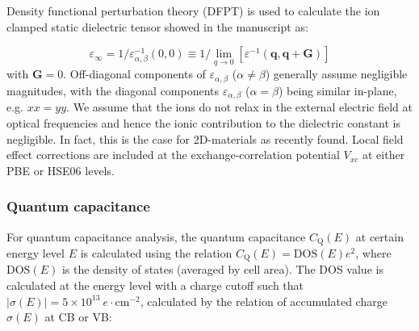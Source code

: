 \documentclass[journal=ancac3,manuscript=article,email=true,hyperref=true,keywords=true]{achemso}
\begin{document}
Density functional perturbation theory (DFPT) is used to calculate the ion clamped
static dielectric tensor showed in the manuscript as\cite{Gajdos:2006aa}:
 
\begin{equation}  
\varepsilon_{\infty}=1/\varepsilon^{-1}_{\alpha,\beta}(0,0) \equiv 1/\lim_{q \to 0}[\varepsilon^{-1} (\mathbf{q},\mathbf{q+G})]
\end{equation}
with $\mathbf{G}=0$. Off-diagonal components of $\varepsilon_{\alpha, \beta}$ ($\alpha \neq \beta$) generally assume 
negligible magnitudes, with the diagonal components $\varepsilon_{\alpha, \beta}$ ($\alpha = \beta$) being 
similar in-plane, e.g. $xx=yy$. 
We assume that the ions do not relax in the
external electric field at optical frequencies and hence the ionic
contribution to the dielectric constant is negligible. 
In fact, this is the case for 2D-materials as recently found\cite{relax-epsilon}. 
Local field effect corrections are included at the exchange-correlation 
potential $V_{xc}$ at either PBE or HSE06 levels. 

%


%
%



\subsubsection{Quantum capacitance}
For quantum capacitance analysis, the quantum capacitance
$C_{\mathrm{Q}}(E)$ at certain energy level $E$ is calculated using
the relation $C_{\mathrm{Q}}(E)=\mathrm{DOS}(E)e^{2}$, where
$\mathrm{DOS}(E)$ is the density of states (averaged by cell
area). The DOS value is calculated at the energy level with a charge
cutoff such that
$|\sigma(E)| = 5 \times 10^{13}\ e\cdot\mathrm{cm}^{-2}$, calculated by
the relation of accumulated charge $\sigma(E)$ at CB or VB:
\end{document}
